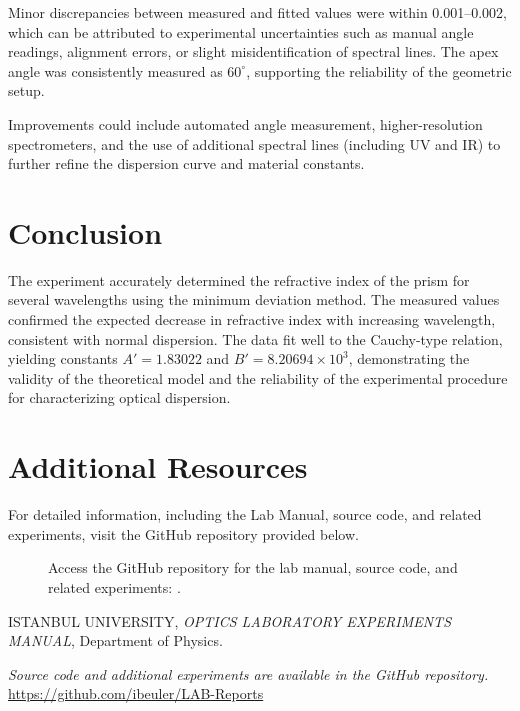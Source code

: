 \documentclass[journal]{IEEEtran}
\begin{document}
Minor discrepancies between measured and fitted values were within 0.001–0.002, which can be attributed to experimental uncertainties such as manual angle readings, alignment errors, or slight misidentification of spectral lines. The apex angle was consistently measured as \( 60^\circ \), supporting the reliability of the geometric setup.

Improvements could include automated angle measurement, higher-resolution spectrometers, and the use of additional spectral lines (including UV and IR) to further refine the dispersion curve and material constants.
\section{Conclusion}
The experiment accurately determined the refractive index of the prism for several wavelengths using the minimum deviation method. The measured values confirmed the expected decrease in refractive index with increasing wavelength, consistent with normal dispersion. The data fit well to the Cauchy-type relation, yielding constants \( A' = 1.83022 \) and \( B' = 8.20694 \times 10^3 \), demonstrating the validity of the theoretical model and the reliability of the experimental procedure for characterizing optical dispersion.

\section{Additional Resources}
For detailed information, including the Lab Manual, source code, and related experiments, visit the GitHub repository provided below.

\begin{figure}[H]
    \centering
    \begin{minipage}{0.15\textwidth}
        \centering
    \end{minipage}%
    \begin{minipage}{0.2\textwidth}
        \raggedright
        \caption{Access the GitHub repository for the lab manual, source code, and related experiments: \cite{github}.}
        \label{fig:qr_code}
    \end{minipage}
\end{figure}

\begin{thebibliography}{9}
    ISTANBUL UNIVERSITY, \textit{OPTICS LABORATORY EXPERIMENTS MANUAL}, Department of Physics.

    \textit{Source code and additional experiments are available in the GitHub repository.} \url{https://github.com/ibeuler/LAB-Reports}
\end{thebibliography}
\end{document}

